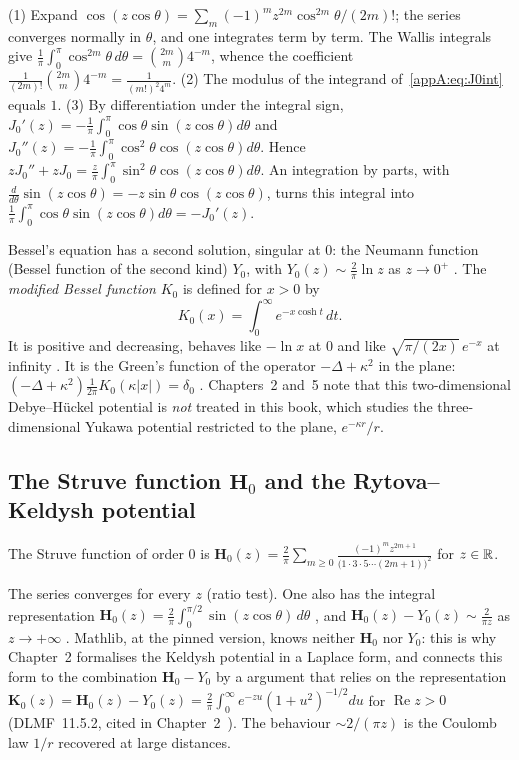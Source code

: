 \begin{humanproof}
(1) Expand $\cos(z\cos\theta)=\sum_m(-1)^m z^{2m}\cos^{2m}\theta/(2m)!$; the series converges normally in
$\theta$, and one integrates term by term. The Wallis integrals give
$\frac1\pi\int_0^\pi\cos^{2m}\theta\,d\theta=\binom{2m}m4^{-m}$, whence the coefficient
$\frac{1}{(2m)!}\binom{2m}{m}4^{-m}=\frac{1}{(m!)^2 4^m}$.
(2) The modulus of the integrand of~\eqref{appA:eq:J0int} equals $1$.
(3) By differentiation under the integral sign, $J_0'(z)=-\frac1\pi\int_0^\pi\cos\theta\sin(z\cos\theta)d\theta$ and
$J_0''(z)=-\frac1\pi\int_0^\pi\cos^2\theta\cos(z\cos\theta)d\theta$. Hence
$zJ_0''+zJ_0=\frac z\pi\int_0^\pi\sin^2\theta\cos(z\cos\theta)d\theta$. An integration by parts, with
$\frac{d}{d\theta}\sin(z\cos\theta)=-z\sin\theta\cos(z\cos\theta)$, turns this integral into
$\frac1\pi\int_0^\pi\cos\theta\sin(z\cos\theta)d\theta=-J_0'(z)$.
\end{humanproof}

Bessel's equation has a second solution, singular at $0$: the Neumann function (Bessel function of the second kind)
$Y_0$, with $Y_0(z)\sim\frac2\pi\ln z$ as $z\to0^+$ \tierL. The \emph{modified Bessel function} $K_0$ is defined for
$x>0$ by
\[K_0(x)=\int_0^\infty e^{-x\cosh t}\,dt .\]
It is positive and decreasing, behaves like $-\ln x$ at $0$ and like $\sqrt{\pi/(2x)}\,e^{-x}$ at infinity \tierL.
It is the Green's function of the operator $-\Delta+\kappa^2$ in the plane: $(-\Delta+\kappa^2)\frac1{2\pi}K_0(\kappa|x|)=\delta_0$
\tierL. Chapters~2 and~5 note that this two-dimensional Debye--Hückel potential is \emph{not} treated in
this book, which studies the three-dimensional Yukawa potential restricted to the plane, $e^{-\kappa r}/r$.

\subsection{The Struve function \texorpdfstring{$\mathbf H_0$}{H0} and the Rytova--Keldysh potential}

\begin{definition}
The Struve function of order $0$ is $\mathbf H_0(z)=\frac2\pi\sum_{m\ge0}\frac{(-1)^mz^{2m+1}}{\bigl(1\cdot3\cdot5\cdots(2m+1)\bigr)^2}$
for $z\in\mathbb{R}$.
\end{definition}
The series converges for every $z$ (ratio test). One also has the integral representation
$\mathbf H_0(z)=\frac2\pi\int_0^{\pi/2}\sin(z\cos\theta)\,d\theta$ \tierL, and $\mathbf H_0(z)-Y_0(z)\sim\frac2{\pi z}$
as $z\to+\infty$ \tierL. Mathlib, at the pinned version, knows neither $\mathbf H_0$ nor $Y_0$: this is why
Chapter~2 formalises the Keldysh potential in a Laplace form, and connects this form to the combination
$\mathbf H_0-Y_0$ by a \tierC{} argument that relies on the representation
$\mathbf K_0(z)=\mathbf H_0(z)-Y_0(z)=\frac2\pi\int_0^\infty e^{-zu}(1+u^2)^{-1/2}du$ for $\operatorname{Re}z>0$
(DLMF~11.5.2, cited in Chapter~2~\cite{ch2dlmf}). The behaviour $\sim 2/(\pi z)$ is the Coulomb law $1/r$
recovered at large distances.

